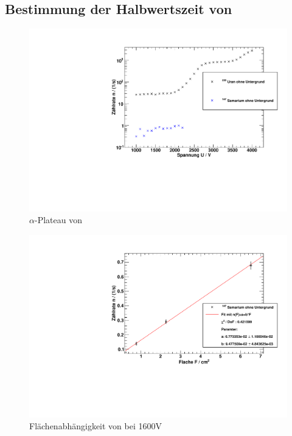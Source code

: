 \subsection{Bestimmung der Halbwertszeit von \samarium}
\begin{figure}[H]
\begin{center}
  \includegraphics[width=15cm]{../img/Samarium147_Charakteristik.pdf}
  \caption[$\alpha$-Plateau mit \samarium]{$\alpha$-Plateau von \samarium} %
  \label{img:char:samarium}
\end{center}
\end{figure}

\begin{figure}[H]
\begin{center}
  \includegraphics[width=15cm]{../img/Samarium147-Flaechenabhaengigkeit.pdf}
  \caption[Flächenabhängigkeit von \samarium]{Flächenabhängigkeit von \samarium bei 1600V}
  \label{figureLabel}
\end{center}
\end{figure}


